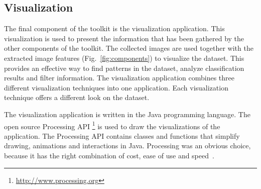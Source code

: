 %



\subsection{Visualization}
The final component of the toolkit is the visualization application.
This visualization is used to present the information that has been gathered by the other components of the toolkit.
The collected images are used together with the extracted image features (Fig.~\ref{fig:components}) to visualize the dataset.
This provides an effective way to find patterns in the dataset, analyze classification results and filter information.
The visualization application combines three different visualization techniques into one application.
Each visualization technique offers a different look on the dataset.

The visualization application is written in the Java programming language.
The open source Processing API \footnote{\url{http://www.processing.org}} is used to draw the visualizations of the application.
The Processing API contains classes and functions that simplify drawing, animations and interactions in Java.
Processing was an obvious choice, because it has the right combination of cost, ease of use and speed~\cite{fry08}.

